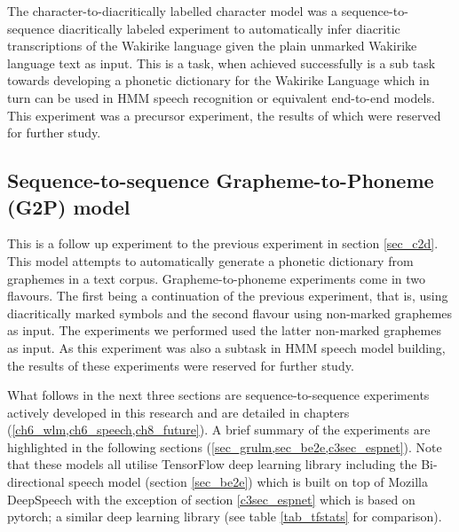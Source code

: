 The character-to-diacritically labelled character model was a sequence-to-sequence diacritically labeled experiment to automatically infer diacritic transcriptions of the Wakirike language given the plain unmarked Wakirike language text as input.  This is a task, when achieved successfully is a sub task towards developing a phonetic dictionary for the Wakirike Language which in turn can be used in HMM speech recognition or equivalent  end-to-end models.  This experiment was a precursor experiment, the results of which were reserved for further study.
\subsection{Sequence-to-sequence Grapheme-to-Phoneme (G2P) model}
This is a follow up experiment to the previous experiment in section \ref{sec_c2d}. This model attempts to automatically generate a phonetic dictionary from graphemes in a text corpus. Grapheme-to-phoneme experiments come in two flavours. The first being a continuation of the previous experiment, that is, using diacritically marked symbols and the second flavour using non-marked graphemes as input.  The experiments we performed used the latter non-marked graphemes as input. As this experiment was also a subtask in HMM speech model building,  the results of these experiments were reserved for further study.  

What follows in the next three sections are sequence-to-sequence experiments actively developed in this research and are detailed in chapters (\ref{ch6_wlm,ch6_speech,ch8_future}).  A brief summary of the experiments are highlighted in the following sections (\ref{sec_grulm,sec_be2e,c3sec_espnet}).  Note that these models all utilise TensorFlow deep learning library including the Bi-directional speech model (section \ref{sec_be2e}) which is built on top of Mozilla DeepSpeech with the exception of section \ref{c3sec_espnet} which is based on pytorch; a similar deep learning library (see table \ref{tab_tfstats} for comparison).

